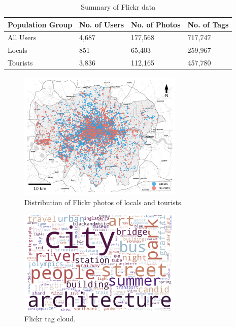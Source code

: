 \documentclass{article}
\begin{document}
\begin{table}
\centering
\caption{\label{tab:flickr_preprocessed}Summary of Flickr data}
\begin{tabular}{llll} \hline
Population Group & No. of Users & No. of Photos & No. of Tags \\ \hline
All Users & 4,687 & 177,568 & 717,747 \\
Locals & 851 & 65,403 & 259,967 \\
Tourists & 3,836 & 112,165 & 457,780 \\ \hline
\end{tabular}
\end{table}

\begin{figure}
\centering
\includegraphics[width=0.7\textwidth]{figures/flickr_distribution.png}
\caption{\label{fig:flickr_distribution}Distribution of Flickr photos of locals and tourists.}
\end{figure}

\begin{figure}
\centering
\includegraphics[width=0.7\textwidth]{figures/flickr_tag_cloud.png}
\caption{\label{fig:flickr_tag_cloud}Flickr tag cloud.}
\end{figure}
\end{document}
